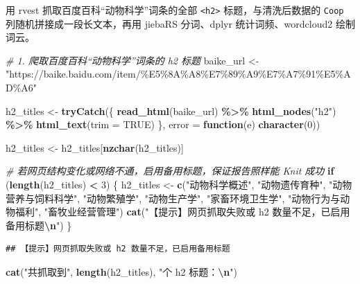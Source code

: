 \documentclass[
]{ctexart}
\newenvironment{Shaded}{\begin{snugshade}}{\end{snugshade}}
\newcommand{\AttributeTok}[1]{\textcolor[rgb]{0.13,0.29,0.53}{#1}}
\newcommand{\CommentTok}[1]{\textcolor[rgb]{0.56,0.35,0.01}{\textit{#1}}}
\newcommand{\ConstantTok}[1]{\textcolor[rgb]{0.56,0.35,0.01}{#1}}
\newcommand{\ControlFlowTok}[1]{\textcolor[rgb]{0.13,0.29,0.53}{\textbf{#1}}}
\newcommand{\DecValTok}[1]{\textcolor[rgb]{0.00,0.00,0.81}{#1}}
\newcommand{\FunctionTok}[1]{\textcolor[rgb]{0.13,0.29,0.53}{\textbf{#1}}}
\newcommand{\NormalTok}[1]{#1}
\newcommand{\OtherTok}[1]{\textcolor[rgb]{0.56,0.35,0.01}{#1}}
\newcommand{\SpecialCharTok}[1]{\textcolor[rgb]{0.81,0.36,0.00}{\textbf{#1}}}
\newcommand{\StringTok}[1]{\textcolor[rgb]{0.31,0.60,0.02}{#1}}
\begin{document}
用 rvest 抓取百度百科``动物科学''词条的全部
\texttt{\textless{}h2\textgreater{}} 标题，与清洗后数据的 \texttt{Coop}
列随机拼接成一段长文本，再用 jiebaRS 分词、dplyr 统计词频、wordcloud2
绘制词云。

\begin{Shaded}
\begin{Highlighting}[]
\CommentTok{\# 1. 爬取百度百科“动物科学”词条的 h2 标题}
\NormalTok{baike\_url }\OtherTok{\textless{}{-}} \StringTok{"https://baike.baidu.com/item/\%E5\%8A\%A8\%E7\%89\%A9\%E7\%A7\%91\%E5\%AD\%A6"}

\NormalTok{h2\_titles }\OtherTok{\textless{}{-}} \FunctionTok{tryCatch}\NormalTok{(\{}
  \FunctionTok{read\_html}\NormalTok{(baike\_url) }\SpecialCharTok{\%\textgreater{}\%}
    \FunctionTok{html\_nodes}\NormalTok{(}\StringTok{"h2"}\NormalTok{) }\SpecialCharTok{\%\textgreater{}\%}
    \FunctionTok{html\_text}\NormalTok{(}\AttributeTok{trim =} \ConstantTok{TRUE}\NormalTok{)}
\NormalTok{\}, }\AttributeTok{error =} \ControlFlowTok{function}\NormalTok{(e) }\FunctionTok{character}\NormalTok{(}\DecValTok{0}\NormalTok{))}

\NormalTok{h2\_titles }\OtherTok{\textless{}{-}}\NormalTok{ h2\_titles[}\FunctionTok{nzchar}\NormalTok{(h2\_titles)]}

\CommentTok{\# 若网页结构变化或网络不通，启用备用标题，保证报告照样能 Knit 成功}
\ControlFlowTok{if}\NormalTok{ (}\FunctionTok{length}\NormalTok{(h2\_titles) }\SpecialCharTok{\textless{}} \DecValTok{3}\NormalTok{) \{}
\NormalTok{  h2\_titles }\OtherTok{\textless{}{-}} \FunctionTok{c}\NormalTok{(}\StringTok{"动物科学概述"}\NormalTok{, }\StringTok{"动物遗传育种"}\NormalTok{, }\StringTok{"动物营养与饲料科学"}\NormalTok{,}
                 \StringTok{"动物繁殖学"}\NormalTok{, }\StringTok{"动物生产学"}\NormalTok{, }\StringTok{"家畜环境卫生学"}\NormalTok{,}
                 \StringTok{"动物行为与动物福利"}\NormalTok{, }\StringTok{"畜牧业经营管理"}\NormalTok{)}
  \FunctionTok{cat}\NormalTok{(}\StringTok{"【提示】网页抓取失败或 h2 数量不足，已启用备用标题}\SpecialCharTok{\textbackslash{}n}\StringTok{"}\NormalTok{)}
\NormalTok{\}}
\end{Highlighting}
\end{Shaded}

\begin{verbatim}
## 【提示】网页抓取失败或 h2 数量不足，已启用备用标题
\end{verbatim}

\begin{Shaded}
\begin{Highlighting}[]
\FunctionTok{cat}\NormalTok{(}\StringTok{"共抓取到"}\NormalTok{, }\FunctionTok{length}\NormalTok{(h2\_titles), }\StringTok{"个 h2 标题：}\SpecialCharTok{\textbackslash{}n}\StringTok{"}\NormalTok{)}
\end{Highlighting}
\end{Shaded}
\end{document}
